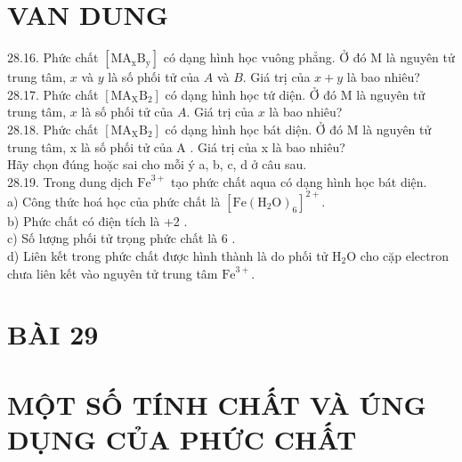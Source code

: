 \documentclass[10pt]{article}
\begin{document}
\section*{VAN DUNG}
28.16. Phức chất $\left[\mathrm{MA}_{\mathrm{x}} \mathrm{B}_{\mathrm{y}}\right]$ có dạng hình học vuông phẳng. Ở đó M là nguyên tử trung tâm, $x$ và $y$ là số phối tử của $A$ và $B$. Giá trị của $x+y$ là bao nhiêu?\\
28.17. Phức chất $\left[\mathrm{MA}_{\mathrm{X}} \mathrm{B}_{2}\right]$ có dạng hình học tứ diện. Ở đó M là nguyên tử trung tâm, $x$ là số phối tử của $A$. Giá trị của $x$ là bao nhiêu?\\
28.18. Phức chất $\left[\mathrm{MA}_{\mathrm{X}} \mathrm{B}_{2}\right]$ có dạng hình học bát diện. Ở đó M là nguyên tử trung tâm, x là số phối tử của A . Giá trị của x là bao nhiêu?\\
Hãy chọn đúng hoặc sai cho mỗi ý a, b, c, d ở câu sau.\\
28.19. Trong dung dịch $\mathrm{Fe}^{3+}$ tạo phức chất aqua có dạng hình học bát diện.\\
a) Công thức hoá học của phức chất là $\left[\mathrm{Fe}\left(\mathrm{H}_{2} \mathrm{O}\right)_{6}\right]^{2+}$.\\
b) Phức chất có điện tích là +2 .\\
c) Số lượng phối tử trọng phức chất là 6 .\\
d) Liên kết trong phức chất được hình thành là do phối tử $\mathrm{H}_{2} \mathrm{O}$ cho cặp electron chưa liên kết vào nguyên tử trung tâm $\mathrm{Fe}^{3+}$.

\section*{BÀI 29}
\section*{MỘT SỐ TÍNH CHẤT VÀ ÚNG DỤNG CỦA PHỨC CHẤT}
\end{document}
